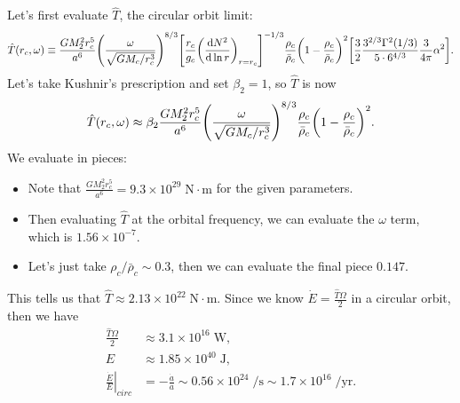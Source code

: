 \documentclass[11pt,
        usenames, %
        dvipsnames %
    ]{article}
\newcommand*{\scinot}[2]{#1\times10^{#2}}
\newcommand*{\rd}[2]{\frac{\mathrm{d}#1}{\mathrm{d}#2}}
\newcommand*{\at}[1]{\left.#1\right|}
\DeclarePairedDelimiter\p{\lparen}{\rparen}
\DeclarePairedDelimiter\s{\lbrack}{\rbrack}
\begin{document}
Let's first evaluate $\hat{T}$, the circular orbit limit:
\begin{equation}
    \hat{T}(r_c, \omega) \equiv \frac{GM_2^2r_c^5}{a^6}
        \p*{\frac{\omega}{\sqrt{GM_c/r_c^3}}}^{8/3}
        \s*{\frac{r_c}{g_c}\p*{\rd{N^2}{\ln r}}_{r = r_c}}^{-1/3}
            \frac{\rho_c}{\bar{\rho}_c} \p*{1 - \frac{\rho_c}{\bar{\rho}_c}}^2
            \s*{\frac{3}{2}\frac{3^{2/3}\Gamma^2(1/3)}{5 \cdot
                6^{4/3}} \frac{3}{4\pi}\alpha^2}.
\end{equation}
Let's take Kushnir's prescription and set $\beta_2 = 1$, so $\hat{T}$ is now
\begin{equation}
    \hat{T}(r_c, \omega) \approx \beta_2\frac{GM_2^2r_c^5}{a^6}
        \p*{\frac{\omega}{\sqrt{GM_c/r_c^3}}}^{8/3}
            \frac{\rho_c}{\bar{\rho}_c} \p*{1 - \frac{\rho_c}{\bar{\rho}_c}}^2.
\end{equation}
We evaluate in pieces:
\begin{itemize}
    \item Note that $\frac{GM_2^2 r_c^5}{a^6} = \scinot{9.3}{29}\;\mathrm{N
        \cdot m}$ for the given parameters.

    \item Then evaluating $\hat{T}$ at the orbital frequency, we can evaluate
        the $\omega$ term, which is $\scinot{1.56}{-7}$.


    \item Let's just take $\rho_c / \bar{\rho}_c \sim 0.3$, then we can evaluate
        the final piece $0.147$.
\end{itemize}
This tells us that $\hat{T} \approx \scinot{2.13}{22}\;\mathrm{N \cdot m}$.
Since we know $\dot{E} = \frac{\hat{T}\Omega}{2}$ in a circular orbit, then we
have
\begin{align}
    \frac{\hat{T}\Omega}{2} &\approx \scinot{3.1}{16}\;\mathrm{W},\\
    E &\approx \scinot{1.85}{40}\;\mathrm{J},\\
    \at{\frac{\dot{E}}{E}}_{circ} &= -\frac{\dot{a}}{a}
        \sim \scinot{0.56}{24}\;\mathrm{/s}
        \sim \scinot{1.7}{16}\;\mathrm{/yr}.
\end{align}
\end{document}
